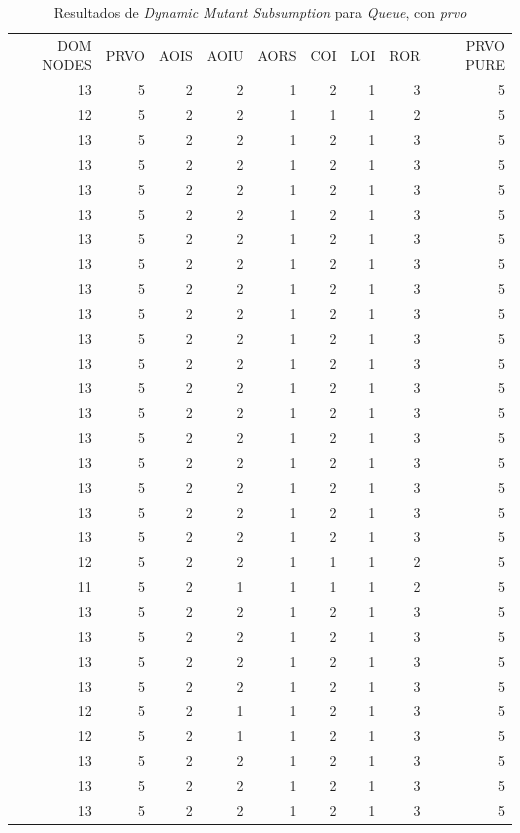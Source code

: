 \begin{table}[]
	\caption{Resultados de \emph{Dynamic Mutant Subsumption} para \emph{Queue}, con \emph{prvo}}
	\label{tables.results.subsumption.queue.prvo}
	\centering
	\scriptsize
	\def\arraystretch{0.95}
	\setlength\tabcolsep{0.5mm}
	\begin{tabular}{rrrrrrrrr}
		DOM NODES & PRVO & AOIS & AOIU & AORS & COI & LOI & ROR & PRVO PURE \\
		13 & 5 & 2 & 2 & 1 & 2 & 1 & 3 & 5 \\
		12 & 5 & 2 & 2 & 1 & 1 & 1 & 2 & 5 \\
		13 & 5 & 2 & 2 & 1 & 2 & 1 & 3 & 5 \\
		13 & 5 & 2 & 2 & 1 & 2 & 1 & 3 & 5 \\
		13 & 5 & 2 & 2 & 1 & 2 & 1 & 3 & 5 \\
		13 & 5 & 2 & 2 & 1 & 2 & 1 & 3 & 5 \\
		13 & 5 & 2 & 2 & 1 & 2 & 1 & 3 & 5 \\
		13 & 5 & 2 & 2 & 1 & 2 & 1 & 3 & 5 \\
		13 & 5 & 2 & 2 & 1 & 2 & 1 & 3 & 5 \\
		13 & 5 & 2 & 2 & 1 & 2 & 1 & 3 & 5 \\
		13 & 5 & 2 & 2 & 1 & 2 & 1 & 3 & 5 \\
		13 & 5 & 2 & 2 & 1 & 2 & 1 & 3 & 5 \\
		13 & 5 & 2 & 2 & 1 & 2 & 1 & 3 & 5 \\
		13 & 5 & 2 & 2 & 1 & 2 & 1 & 3 & 5 \\
		13 & 5 & 2 & 2 & 1 & 2 & 1 & 3 & 5 \\
		13 & 5 & 2 & 2 & 1 & 2 & 1 & 3 & 5 \\
		13 & 5 & 2 & 2 & 1 & 2 & 1 & 3 & 5 \\
		13 & 5 & 2 & 2 & 1 & 2 & 1 & 3 & 5 \\
		13 & 5 & 2 & 2 & 1 & 2 & 1 & 3 & 5 \\
		12 & 5 & 2 & 2 & 1 & 1 & 1 & 2 & 5 \\
		11 & 5 & 2 & 1 & 1 & 1 & 1 & 2 & 5 \\
		13 & 5 & 2 & 2 & 1 & 2 & 1 & 3 & 5 \\
		13 & 5 & 2 & 2 & 1 & 2 & 1 & 3 & 5 \\
		13 & 5 & 2 & 2 & 1 & 2 & 1 & 3 & 5 \\
		13 & 5 & 2 & 2 & 1 & 2 & 1 & 3 & 5 \\
		12 & 5 & 2 & 1 & 1 & 2 & 1 & 3 & 5 \\
		12 & 5 & 2 & 1 & 1 & 2 & 1 & 3 & 5 \\
		13 & 5 & 2 & 2 & 1 & 2 & 1 & 3 & 5 \\
		13 & 5 & 2 & 2 & 1 & 2 & 1 & 3 & 5 \\
		13 & 5 & 2 & 2 & 1 & 2 & 1 & 3 & 5
	\end{tabular}
\end{table}